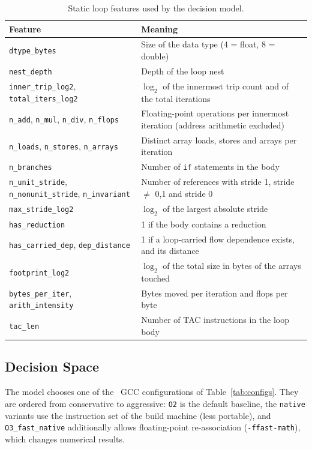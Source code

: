 \begin{table}[H]
\centering
\caption{Static loop features used by the decision model.}
\label{tab:features}
\footnotesize
\begin{tabularx}{\textwidth}{lX}
\toprule
\textbf{Feature} & \textbf{Meaning}\\
\midrule
\texttt{dtype\_bytes} & Size of the data type (4 = float, 8 = double)\\
\texttt{nest\_depth} & Depth of the loop nest\\
\texttt{inner\_trip\_log2}, \texttt{total\_iters\_log2} & $\log_2$ of the innermost trip count and of the total iterations\\
\texttt{n\_add}, \texttt{n\_mul}, \texttt{n\_div}, \texttt{n\_flops} & Floating-point operations per innermost iteration (address arithmetic excluded)\\
\texttt{n\_loads}, \texttt{n\_stores}, \texttt{n\_arrays} & Distinct array loads, stores and arrays per iteration\\
\texttt{n\_branches} & Number of \texttt{if} statements in the body\\
\texttt{n\_unit\_stride}, \texttt{n\_nonunit\_stride}, \texttt{n\_invariant} & Number of references with stride 1, stride $\neq$ 0,1 and stride 0\\
\texttt{max\_stride\_log2} & $\log_2$ of the largest absolute stride\\
\texttt{has\_reduction} & 1 if the body contains a reduction\\
\texttt{has\_carried\_dep}, \texttt{dep\_distance} & 1 if a loop-carried flow dependence exists, and its distance\\
\texttt{footprint\_log2} & $\log_2$ of the total size in bytes of the arrays touched\\
\texttt{bytes\_per\_iter}, \texttt{arith\_intensity} & Bytes moved per iteration and flops per byte\\
\texttt{tac\_len} & Number of TAC instructions in the loop body\\
\bottomrule
\end{tabularx}
\end{table}

\subsection{Decision Space}

The model chooses one of the \numConfigs\ GCC configurations of Table~\ref{tab:configs}.
They are ordered from conservative to aggressive: \texttt{O2} is the default baseline,
the \texttt{native} variants use the instruction set of the build machine (less portable),
and \texttt{O3\_fast\_native} additionally allows floating-point re-association
(\texttt{-ffast-math}), which changes numerical results.

